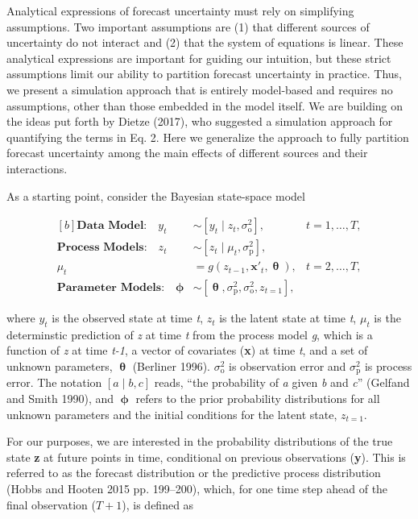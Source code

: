 \documentclass[12pt,]{article}
\begin{document}
Analytical expressions of forecast uncertainty must rely on simplifying
assumptions. Two important assumptions are (1) that different sources of
uncertainty do not interact and (2) that the system of equations is
linear. These analytical expressions are important for guiding our
intuition, but these strict assumptions limit our ability to partition
forecast uncertainty in practice. Thus, we present a simulation approach
that is entirely model-based and requires no assumptions, other than
those embedded in the model itself. We are building on the ideas put
forth by Dietze (2017), who suggested a simulation approach for
quantifying the terms in Eq. 2. Here we generalize the approach to fully
partition forecast uncertainty among the main effects of different
sources and their interactions.

As a starting point, consider the Bayesian state-space model

\begin{equation}
\begin{aligned}[b]
\textbf{Data Model:} \quad y_t &\sim \left[y_t \;|\; z_t, \sigma^2_{\text{o}}\right], &t = 1,\dots,T, \\ 
\textbf{Process Models:} \quad z_t &\sim \left[z_t \;|\; \mu_t, \sigma^2_{\text{p}}\right],  \\ 
\mu_t &= g \left(z_{t-1},\textbf{x}'_t, \bm{\uptheta} \right), &t = 2,\dots,T, \\ 
\textbf{Parameter Models:} \quad \bm{\upphi} &\sim \left[\bm{\uptheta},\sigma^2_{\text{p}},\sigma^2_{\text{o}},z_{t=1} \right],
\end{aligned}
\end{equation}

\noindent{}where \(y_t\) is the observed state at time \emph{t}, \(z_t\)
is the latent state at time \emph{t}, \(\mu_t\) is the determinstic
prediction of \emph{z} at time \emph{t} from the process model \emph{g},
which is a function of \emph{z} at time \emph{t-1}, a vector of
covariates (\textbf{x}) at time \emph{t}, and a set of unknown
parameters, \(\bm{\uptheta}\) (Berliner 1996). \(\sigma^2_{\text{o}}\)
is observation error and \(\sigma^2_{\text{p}}\) is process error. The
notation \(\left[a \;|\; b, c\right]\) reads, ``the probability of
\emph{a} given \emph{b} and \emph{c}'' (Gelfand and Smith 1990), and
\(\bm{\upphi}\) refers to the prior probability distributions for all
unknown parameters and the initial conditions for the latent state,
\(z_{t=1}\).

For our purposes, we are interested in the probability distributions of
the true state \textbf{z} at future points in time, conditional on
previous observations (\textbf{y}). This is referred to as the forecast
distribution or the predictive process distribution (Hobbs and Hooten
2015 pp. 199--200), which, for one time step ahead of the final
observation (\(T+1\)), is defined as
\end{document}
